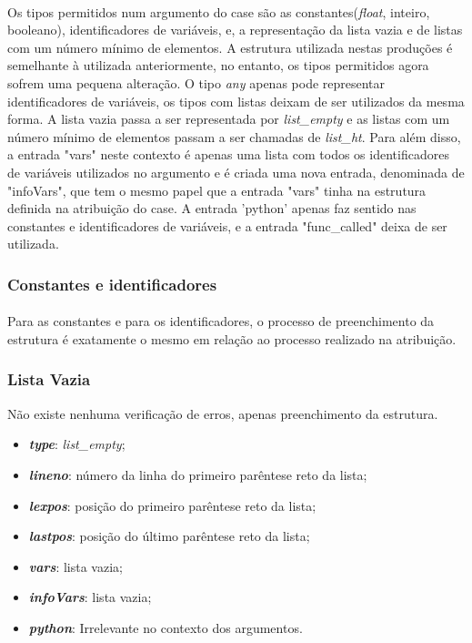 \documentclass[11pt,a4paper]{report}
\begin{document}
\paragraph*{}
Os tipos permitidos num argumento do case são as constantes(\textit{float}, inteiro, booleano), identificadores de variáveis, e, a representação da lista vazia e de listas com um número mínimo de elementos. A estrutura utilizada nestas produções é semelhante à utilizada anteriormente, no entanto, os tipos permitidos agora sofrem uma pequena alteração. O tipo \textit{any} apenas pode representar identificadores de variáveis, os tipos com listas deixam de ser utilizados da mesma forma. A lista vazia passa a ser representada por \textit{list\_empty} e as listas com um número mínimo de elementos passam a ser chamadas de \textit{list\_ht}. Para além disso, a entrada "vars" neste contexto é apenas uma lista com todos os identificadores de variáveis utilizados no argumento e é criada uma nova entrada, denominada de "infoVars", que tem o mesmo papel que a entrada "vars" tinha na estrutura definida na atribuição do case. A entrada 'python' apenas faz sentido nas constantes e identificadores de variáveis, e a entrada "func\_called" deixa de ser utilizada.

\subsubsection{Constantes e identificadores}
\paragraph*{}
Para as constantes e para os identificadores, o processo de preenchimento da estrutura é exatamente o mesmo em relação ao processo realizado na atribuição.

\subsubsection{Lista Vazia}
Não existe nenhuma verificação de erros, apenas preenchimento da estrutura. 

\begin{itemize}
  \item \textit{\textbf{type}}: \textit{list\_empty};
  \item \textit{\textbf{lineno}}: número da linha do primeiro parêntese reto da lista;
  \item \textit{\textbf{lexpos}}: posição do primeiro parêntese reto da lista;
  \item \textit{\textbf{lastpos}}: posição do último parêntese reto da lista;
  \item \textit{\textbf{vars}}: lista vazia;
  \item \textit{\textbf{infoVars}}: lista vazia;
  \item \textit{\textbf{python}}: Irrelevante no contexto dos argumentos.
\end{itemize}
\end{document}
